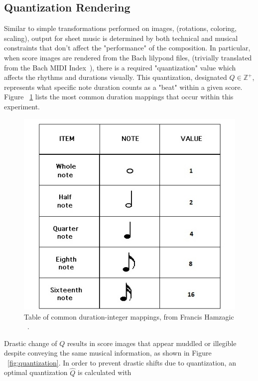\documentclass[nonacm, sigconf]{acmart}
\begin{document}
\subsection{Quantization Rendering}
Similar to simple transformations performed on images, (rotations, coloring, scaling), output for sheet music is determined by both technical and musical constraints that don't affect the "performance" of the composition.
In particular, when score images are rendered from the Bach lilypond files, (trivially translated from the Bach MIDI Index~\cite{bach_midi}), there is a required "quantization" value which affects the rhythms and durations visually.
This quantization, designated $Q \in \mathbb{Z}^+$, represents what specific note duration counts as a "beat" within a given score. 
Figure ~\ref{fig:table-duration} lists the most common duration mappings that occur within this experiment.

\begin{figure}
	\centering
	\includegraphics[width = .8\linewidth]{./figures/notevalues.jpeg}
	\caption{Table of common duration-integer mappings, from Francis Hamzagic ~\cite{hamzagic_2018}.}
	\label{fig:table-duration}
\end{figure}

Drastic change of $Q$ results in score images that appear muddled or illegible despite conveying the same musical information, as shown in Figure ~\ref{fig:quantization}.
In order to prevent drastic shifts due to quantization, an optimal quantization $\hat Q$ is calculated with
\end{document}
